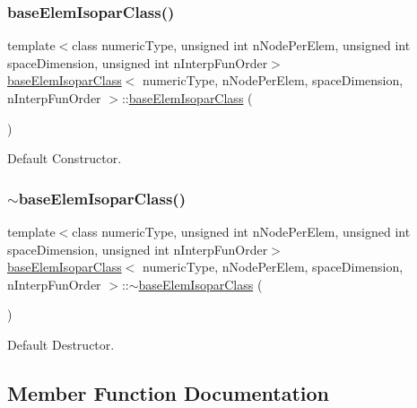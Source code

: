 \subsubsection{\texorpdfstring{base\+Elem\+Isopar\+Class()}{baseElemIsoparClass()}}
{\footnotesize\ttfamily template$<$class numeric\+Type, unsigned int n\+Node\+Per\+Elem, unsigned int space\+Dimension, unsigned int n\+Interp\+Fun\+Order$>$ \\
\mbox{\hyperlink{classbase_elem_isopar_class}{base\+Elem\+Isopar\+Class}}$<$ numeric\+Type, n\+Node\+Per\+Elem, space\+Dimension, n\+Interp\+Fun\+Order $>$\+::\mbox{\hyperlink{classbase_elem_isopar_class}{base\+Elem\+Isopar\+Class}} (\begin{DoxyParamCaption}{ }\end{DoxyParamCaption})\hspace{0.3cm}{\ttfamily [inline]}}

Default Constructor. \mbox{\label{classbase_elem_isopar_class_a4af2c68ee324c3f47bf75dfdb395eaee}} 
\subsubsection{\texorpdfstring{$\sim$base\+Elem\+Isopar\+Class()}{~baseElemIsoparClass()}}
{\footnotesize\ttfamily template$<$class numeric\+Type, unsigned int n\+Node\+Per\+Elem, unsigned int space\+Dimension, unsigned int n\+Interp\+Fun\+Order$>$ \\
\mbox{\hyperlink{classbase_elem_isopar_class}{base\+Elem\+Isopar\+Class}}$<$ numeric\+Type, n\+Node\+Per\+Elem, space\+Dimension, n\+Interp\+Fun\+Order $>$\+::$\sim$\mbox{\hyperlink{classbase_elem_isopar_class}{base\+Elem\+Isopar\+Class}} (\begin{DoxyParamCaption}{ }\end{DoxyParamCaption})\hspace{0.3cm}{\ttfamily [inline]}}

Default Destructor. 

\subsection{Member Function Documentation}
\mbox{\label{classbase_elem_isopar_class_a9ee4f097e6c0a1affe6d9a6f6dc233ab}} 
